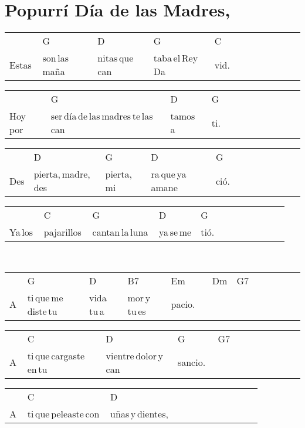 \section*{Popurrí Día de las Madres, \hfill}
\begin{multicols}{2}
\noindent
\begin{minipage}{\columnwidth}
\noindent
\noindent
\begin{tabular}{llllllllllll}
&G&D&G&C\\
Estas\,&son\,las\,maña&nitas\,que\,can&taba\,el\,Rey\,Da&vid.
\end{tabular}

\noindent
\begin{tabular}{llllllllllll}
&G&D&G\\
Hoy\,por\,&ser\,día\,de\,las\,madres\,te\,las\,can&tamos\,a\,&ti.
\end{tabular}

\noindent
\begin{tabular}{llllllllllll}
&D&G&D&G\\
Des&pierta,\,madre,\,des&pierta,\,mi&ra\,que\,ya\,amane&ció.
\end{tabular}

\noindent
\begin{tabular}{llllllllllll}
&C&G&D&G\\
Ya\,los\,&pajarillos\,&cantan\,la\,luna\,&ya\,se\,me&tió.
\end{tabular}
\end{minipage}\\

\noindent
\begin{minipage}{\columnwidth}
\noindent
\noindent
\begin{tabular}{llllllllllll}
&G&D&B7&Em&Dm&G7\\
A\,&ti\,que\,me\,diste\,tu\,&vida\,tu\,a&mor\,y\,tu\,es&pacio.\,\,\,\,\,&\,\,\quad\,\,\,&
\end{tabular}

\noindent
\begin{tabular}{llllllllllll}
&C&D&G&G7\\
A\,&ti\,que\,cargaste\,en\,tu\,&vientre\,dolor\,y\,can&sancio.\,\,&
\end{tabular}

\noindent
\begin{tabular}{llllllllllll}
&C&D\\
A\,&ti\,que\,peleaste\,con\,&uñas\,y\,dientes,
\end{tabular}


\end{minipage}
\end{multicols}
